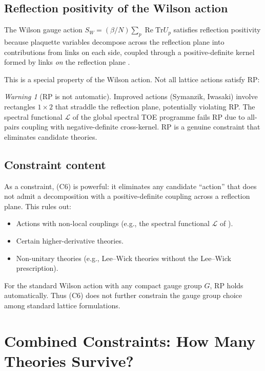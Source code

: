\documentclass[12pt]{article}
\theoremstyle{definition}
\theoremstyle{remark}
\newtheorem{warning}[theorem]{Warning}
\newcommand{\Tr}{\mathrm{Tr}}
\newcommand{\re}{\operatorname{Re}}
\begin{document}
\subsection{Reflection positivity of the Wilson action}

The Wilson gauge action
$S_W = (\beta/N)\sum_p \re\Tr U_p$ satisfies reflection
positivity because plaquette variables decompose across
the reflection plane into contributions from links on each
side, coupled through a positive-definite kernel formed by
links \emph{on} the reflection plane \cite{OS78}.

This is a special property of the Wilson action.  Not all
lattice actions satisfy RP:

\begin{warning}[RP is not automatic]
\label{warn:RP}
Improved actions (Symanzik, Iwasaki) involve rectangles
$1 \times 2$ that straddle the reflection plane, potentially
violating RP.  The spectral functional $\mathcal{L}$ of the
global spectral TOE programme \cite{Olbryk2026v5} fails RP
due to all-pairs coupling with negative-definite cross-kernel.
RP is a genuine constraint that eliminates candidate theories.
\end{warning}

\subsection{Constraint content}

As a constraint, (C6) is powerful: it eliminates any candidate
``action'' that does not admit a decomposition with a
positive-definite coupling across a reflection plane.
This rules out:
\begin{itemize}
\item Actions with non-local couplings (e.g., the spectral
  functional $\mathcal{L}$ of \cite{Olbryk2026v5}).
\item Certain higher-derivative theories.
\item Non-unitary theories (e.g., Lee--Wick theories without
  the Lee--Wick prescription).
\end{itemize}

For the standard Wilson action with any compact gauge group $G$,
RP holds automatically.  Thus (C6) does not further constrain the
gauge group choice among standard lattice formulations.

\section{Combined Constraints: How Many Theories Survive?}
\label{sec:combined}
\end{document}
